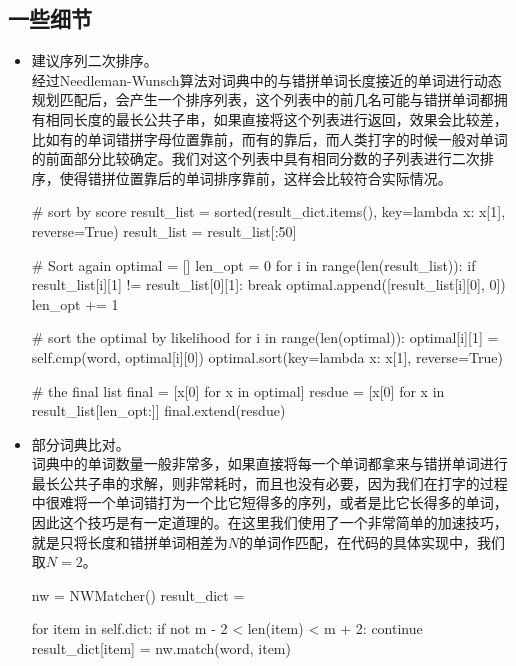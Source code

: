 \documentclass[UTF8,a4paper]{ctexart}
\begin{document}
\subsection{一些细节}
\label{details}
\begin{itemize}
\item 建议序列二次排序。\\
经过Needleman-Wunsch算法对词典中的与错拼单词长度接近的单词进行动态规划匹配后，会产生一个排序列表，这个列表中的前几名可能与错拼单词都拥有相同长度的最长公共子串，如果直接将这个列表进行返回，效果会比较差，比如有的单词错拼字母位置靠前，而有的靠后，而人类打字的时候一般对单词的前面部分比较确定。我们对这个列表中具有相同分数的子列表进行二次排序，使得错拼位置靠后的单词排序靠前，这样会比较符合实际情况。

\begin{python}
# sort by score
result_list = sorted(result_dict.items(), key=lambda x: x[1], reverse=True)
result_list = result_list[:50]

# Sort again
optimal = []
len_opt = 0
for i in range(len(result_list)):
    if result_list[i][1] != result_list[0][1]:
        break
    optimal.append([result_list[i][0], 0])
    len_opt += 1

# sort the optimal by likelihood
for i in range(len(optimal)):
    optimal[i][1] = self.cmp(word, optimal[i][0])
optimal.sort(key=lambda x: x[1], reverse=True)

# the final list
final = [x[0] for x in optimal]
resdue = [x[0] for x in result_list[len_opt:]]
final.extend(resdue)
\end{python}

\item 部分词典比对。\\
词典中的单词数量一般非常多，如果直接将每一个单词都拿来与错拼单词进行最长公共子串的求解，则非常耗时，而且也没有必要，因为我们在打字的过程中很难将一个单词错打为一个比它短得多的序列，或者是比它长得多的单词，因此这个技巧是有一定道理的。在这里我们使用了一个非常简单的加速技巧，就是只将长度和错拼单词相差为$N$的单词作匹配，在代码的具体实现中，我们取$N=2$。

\begin{python}
nw = NWMatcher()
result_dict = {}

for item in self.dict:
    if not m - 2 < len(item) < m + 2:
        continue
    result_dict[item] = nw.match(word, item)
\end{python}

\end{itemize}
\end{document}
